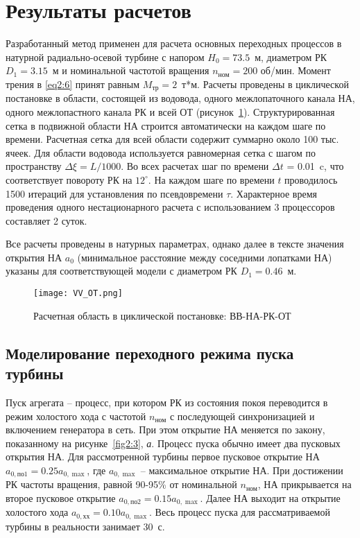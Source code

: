 \section{Результаты расчетов}
\label{s:24}
Разработанный метод применен для расчета основных переходных процессов в натурной радиально-осевой турбине 
с напором $ H_0=73.5$~м, диаметром РК $D_1=3.15$~м и номинальной частотой 
вращения $n_{\text{ном}}=200$ об/мин. 
Момент трения в \eqref{eq2:6} принят равным $M_{\text{тр}}=2$~т*м. Расчеты проведены в циклической
постановке в области, состоящей из водовода, одного межлопаточного канала НА, одного межлопастного канала РК и 
всей ОТ (рисунок~\ref{fig2:2}). Структурированная сетка в подвижной области НА строится автоматически на каждом 
шаге по времени. Расчетная сетка для всей области содержит суммарно около 100 тыс. ячеек.  Для области
водовода используется равномерная сетка с шагом по пространству $\Delta \xi=L/1000$. Во всех расчетах шаг по 
времени $\Delta t$ = 0.01~c, что соответствует повороту РК на $12^{\circ}$. На каждом шаге по времени $t$ 
проводилось 1500 итераций для установления по псевдовремени $\tau$. Характерное время проведения одного
нестационарного расчета с использованием 3 процессоров составляет 2 суток.

Все расчеты проведены в натурных параметрах, однако далее в тексте значения открытия НА $a_0$ (минимальное расстояние между соседними лопатками НА) указаны для соответствующей модели с диаметром РК $D_1=0.46$~м.
\begin{figure}[h]
  \centering
  \texttt{[image: VV\_OT.png]}
  \caption{Расчетная область в циклической постановке: ВВ-НА-РК-ОТ}
  \label{fig2:2}
\end{figure}

\subsection{Моделирование переходного режима пуска турбины}
Пуск агрегата -- процесс, при котором РК из состояния покоя переводится в режим холостого хода с частотой 
$n_{\text{ном}}$ с последующей синхронизацией и включением генератора в сеть. При этом открытие НА меняется по 
закону, показанному на рисунке~\ref{fig2:3}, \emph{а}. Процесс пуска обычно имеет два пусковых открытия НА. 
Для рассмотренной турбины первое пусковое открытие НА $ a_{0, \text{по1}}=0.25a_{0,\max }$, где $a_{0,\max }$ 
-- максимальное открытие НА. При достижении РК частоты вращения, равной 90-95\% от номинальной 
$n_{\text{ном}}$, НА прикрывается на второе пусковое открытие $ a_{0, \text{по2}}=0.15a_{0,\max }$. Далее НА 
выходит на открытие холостого хода $a_{0,\text{хх}}=0.10a_{0,\max }$. Весь процесс пуска для рассматриваемой 
турбины в реальности занимает 30~с.

